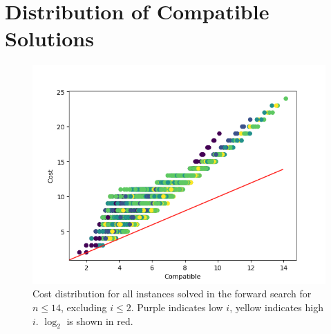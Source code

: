 \documentclass[twoside,leqno,twocolumn]{article}
\begin{document}
\section{Distribution of Compatible Solutions}

\begin{figure}[h]
  \includegraphics*[scale=0.5]{figures/compatible_cost_relation.png}
  \caption*{Cost distribution for all instances solved in the forward search for $n \leq 14$, excluding $i \leq 2$.
    Purple indicates low $i$, yellow indicates high $i$. $\log_2$ is shown in red.}
\end{figure}
\end{document}
